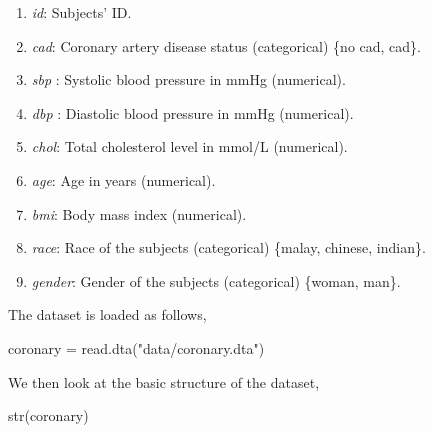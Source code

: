 \documentclass[
  10pt,
]{krantz}
\newenvironment{Shaded}{\begin{snugshade}}{\end{snugshade}}
\newcommand{\FunctionTok}[1]{\textcolor[rgb]{0.00,0.00,0.00}{#1}}
\newcommand{\NormalTok}[1]{#1}
\newcommand{\OtherTok}[1]{\textcolor[rgb]{0.56,0.35,0.01}{#1}}
\newcommand{\StringTok}[1]{\textcolor[rgb]{0.31,0.60,0.02}{#1}}
\providecommand{\tightlist}{%
  \setlength{\itemsep}{0pt}\setlength{\parskip}{0pt}}
\begin{document}
\begin{enumerate}
\def\labelenumi{\arabic{enumi}.}
\tightlist
\item
  \emph{id}: Subjects' ID.
\item
  \emph{cad}: Coronary artery disease status (categorical) \{no cad, cad\}.
\item
  \emph{sbp} : Systolic blood pressure in mmHg (numerical).
\item
  \emph{dbp} : Diastolic blood pressure in mmHg (numerical).
\item
  \emph{chol}: Total cholesterol level in mmol/L (numerical).
\item
  \emph{age}: Age in years (numerical).
\item
  \emph{bmi}: Body mass index (numerical).
\item
  \emph{race}: Race of the subjects (categorical) \{malay, chinese, indian\}.
\item
  \emph{gender}: Gender of the subjects (categorical) \{woman, man\}.
\end{enumerate}

The dataset is loaded as follows,

\begin{Shaded}
\begin{Highlighting}[]
\NormalTok{coronary }\OtherTok{=} \FunctionTok{read.dta}\NormalTok{(}\StringTok{"data/coronary.dta"}\NormalTok{)}
\end{Highlighting}
\end{Shaded}

We then look at the basic structure of the dataset,

\begin{Shaded}
\begin{Highlighting}[]
\FunctionTok{str}\NormalTok{(coronary)}
\end{Highlighting}
\end{Shaded}
\end{document}
